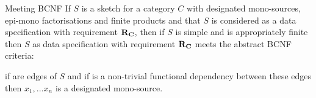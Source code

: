 \begin{frame}{Meeting BCNF}{\slidecontext}
If $S$ is a sketch for a category $C$ with designated mono-sources, epi-mono factorisations  and finite products
and that $S$ is considered as a data specification with requirement $\reqtc$, then 
if $S$ is simple and \catcw is appropriately finite then $S$ as data specification
with requirement $\reqtc$ meets the abstract BCNF criteria:

\pause if  
are edges of $S$
and if   is a non-trivial functional dependency  between these edges then
$x_1,...x_n$ is a designated mono-source.
\end{frame}


\iffalse
\begin{frame}{Referential Inclusion Dependencies}{\slidecontext}
\begin{definition}
If $\catc$ is a category with \thirdstructure, if $\reqtc$ is a set of instances 
and if \fnsourceqnsource in $\catc$ and  $\set{q_1,...q_n}$ is a mono-source
 then a \term{referential inclusion dependency} $I$, 
 written $a[f_1,...f_n] \overset{I}{\subseteq} c[q_1,..q_n]$, 
 is a family of functions $I_D)_{D \in \reqtc}$
such that for each instance $D \in \reqtc$, $I_D$ is a function $I_D : D(a) \morph D(c)$ and
for each $i$, $1 \leq i \le n$, $I_D \circ D(q_i) = D(f_i)$.
\end{definition}
\end{frame}

\begin{frame}{Representation of Referential Inclusion Dependencies}{\slidecontext}
\begin{definition}
If $\catc$ is a category with \thirdstructure
and if $\reqtc$ is a set of instances
and \fnsourceqnsource in $\catc$ 
and if $a[f_1,...f_n] \overset{I}{\subseteq} c[q_1,..q_n]$ is a referential inclusion dependency
with respect  to $\reqtc$ 
then say that the inclusion dependency $I$ is \term{represented} in $\catc$
iff there exists a morphism $i:a \morph c$ in $\catc$ such that in each instance $D \in \reqtc$, $D(i) = I_D$. 
\end{definition}
\end{frame}
\fi
